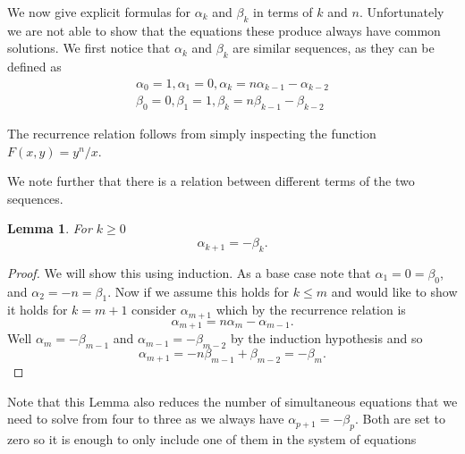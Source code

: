 \documentclass[12pt]{article}
\newtheorem{lemma}{Lemma}
\begin{document}
We now give explicit formulas for $\alpha_k$ and $\beta_k$ in terms of $k$ and $n$. Unfortunately we are not able to show that the equations these produce always have common solutions. 
We first notice that $\alpha_k$ and $\beta_k$ are similar sequences, as they can be defined as
\begin{align*}
\alpha_0 = 1, \alpha_1 = 0, \alpha_k = n\alpha_{k-1} - \alpha_{k-2}\\
\beta_0 = 0, \beta_1 = 1, \beta_k = n\beta_{k-1} - \beta_{k-2}
\end{align*}

The recurrence relation follows from simply inspecting the function $F(x,y) = y^n/x$.

We note further that there is a relation between different terms of the two sequences.  
\begin{lemma} 
\label{ab} For $k\geq 0$
\begin{equation*}
\alpha_{k+1} = - \beta_{k}.
\end{equation*}
\end{lemma}
\begin{proof}
We will show this using induction. As a base case note that $\alpha_1 = 0 = \beta_0$, and $\alpha_2 = -n = \beta_1$. Now if we assume this holds for $k \leq m$ and would like to show it holds for $k = m+1$ consider $\alpha_{m+1}$ which by the recurrence relation is
\begin{equation*}
\alpha_{m+1} = n \alpha_{m} - \alpha_{m-1}.
\end{equation*}
Well $\alpha_m = -\beta_{m-1}$ and $\alpha_{m-1} = - \beta_{m-2}$ by the induction hypothesis and so 
\begin{equation*}
\alpha_{m+1} = - n \beta_{m-1} + \beta_{m-2} = -\beta_{m}.
\end{equation*}
\end{proof}
Note that this Lemma also reduces the number of simultaneous equations that we need to solve from four to three as we always have $\alpha_{p+1} = - \beta_{p}$. Both are set to zero so it is enough to only include one of them in the system of equations 
\end{document}
